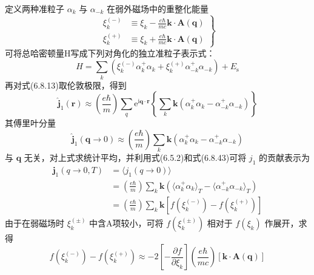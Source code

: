 定义两种准粒子 $\alpha_{k}$ 与 $\alpha_{-k}$ 在弱外磁场中的重整化能量
\begin{equation}
  \left.
  \begin{aligned}
    \xi^{(-)}_{k}&\equiv\xi_{k}
    -\frac{e\hbar}{mc}\boldsymbol{k}\cdot\boldsymbol{A}(\boldsymbol{q})\\
    \xi^{(+)}_{k}&\equiv\xi_{k}
    +\frac{e\hbar}{mc}\boldsymbol{k}\cdot\boldsymbol{A}(\boldsymbol{q})
  \end{aligned}\right\}
\end{equation}
可将总哈密顿量H写成下列对角化的独立准粒子表示式：
\begin{equation}
  H=\sum_{k}\left(\xi^{(-)}_{k}\alpha^{+}_{k}\alpha_{k}
  +\xi^{(+)}_{k}\alpha^{+}_{-k}\alpha_{-k}\right)+E_{\mathrm{s}}
\end{equation}
再对式(6.8.13)取伦敦极限，得到
\begin{equation}
  \hat{\boldsymbol{j}}_{1}(\boldsymbol{r})\approx
  \left(\frac{e\hbar}{m}\right)\sum_{q}\mathrm{e}^{\mathrm{i}\boldsymbol{q}\cdot\boldsymbol{r}}
  \left\{\sum_{k}\boldsymbol{k}\left(\alpha^{+}_{k}\alpha_{k}
  -\alpha^{+}_{-k}\alpha_{-k}\right)\right\}
\end{equation}
其傅里叶分量
\begin{equation}
  \hat{\boldsymbol{j}}_{1}(\boldsymbol{q}\to0)\approx
  \left(\frac{e\hbar}{m}\right)\sum_{k}\boldsymbol{k}
  \left(\alpha^{+}_{k}\alpha_{k}-\alpha^{+}_{-k}\alpha_{-k}\right)
\end{equation}
与 $\boldsymbol{q}$ 无关，对上式求统计平均，并利用式(6.5.2)和式(6.8.43)可将 $j_{1}$ 的贡献表示为
\begin{equation}
\begin{aligned}
  \boldsymbol{j}_{1}(q\to0,T)&=\langle j_{1}(q\to0)\rangle\\
  &=\left(\frac{e\hbar}{m}\right)\sum_{k}\boldsymbol{k}
  \left(\langle\alpha^{+}_{k}\alpha_{k}\rangle_{T}
  -\langle\alpha^{+}_{-k}\alpha_{-k}\rangle_{T}\right)\\
  &=\left(\frac{e\hbar}{m}\right)\sum_{k}\boldsymbol{k}
  \left[f\left(\xi^{(-)}_{k}\right)-f\left(\xi^{(+)}_{k}\right)\right]
\end{aligned}
\end{equation}
由于在弱磁场时 $\xi^{(\pm)}_{k}$ 中含A项较小，可将 $f\left(\xi^{(\pm)}_{k}\right)$ 相对于 $f(\xi_{k})$ 作展开，求得
\begin{equation}
  f\left(\xi^{(-)}_{k}\right)-f\left(\xi^{(+)}_{k}\right)
  \approx-2\left[-\frac{\partial f}{\partial\xi_{k}}\right]
  \left(\frac{e\hbar}{mc}\right)
  \left[\boldsymbol{k}\cdot\boldsymbol{A}(\boldsymbol{q})\right]
\end{equation}
